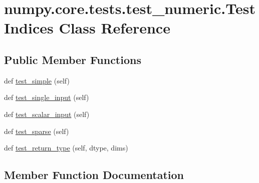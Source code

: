 \hypertarget{classnumpy_1_1core_1_1tests_1_1test__numeric_1_1TestIndices}{}\section{numpy.\+core.\+tests.\+test\+\_\+numeric.\+Test\+Indices Class Reference}
\label{classnumpy_1_1core_1_1tests_1_1test__numeric_1_1TestIndices}
\subsection*{Public Member Functions}
\begin{DoxyCompactItemize}
\item 
def \hyperlink{classnumpy_1_1core_1_1tests_1_1test__numeric_1_1TestIndices_a8f3c940cebaebcbc39d2c1375a948edc}{test\+\_\+simple} (self)
\item 
def \hyperlink{classnumpy_1_1core_1_1tests_1_1test__numeric_1_1TestIndices_ac093358f4be6425b9e7b2c04e4cecc4f}{test\+\_\+single\+\_\+input} (self)
\item 
def \hyperlink{classnumpy_1_1core_1_1tests_1_1test__numeric_1_1TestIndices_a81130c60b001df048f942a1131bed3fd}{test\+\_\+scalar\+\_\+input} (self)
\item 
def \hyperlink{classnumpy_1_1core_1_1tests_1_1test__numeric_1_1TestIndices_a672198ea621e89b7f64989ba4b68db28}{test\+\_\+sparse} (self)
\item 
def \hyperlink{classnumpy_1_1core_1_1tests_1_1test__numeric_1_1TestIndices_a798ae97546e8579c2a3c8a3c98f41601}{test\+\_\+return\+\_\+type} (self, dtype, dims)
\end{DoxyCompactItemize}


\subsection{Member Function Documentation}
\mbox{\label{classnumpy_1_1core_1_1tests_1_1test__numeric_1_1TestIndices_a798ae97546e8579c2a3c8a3c98f41601}} 

